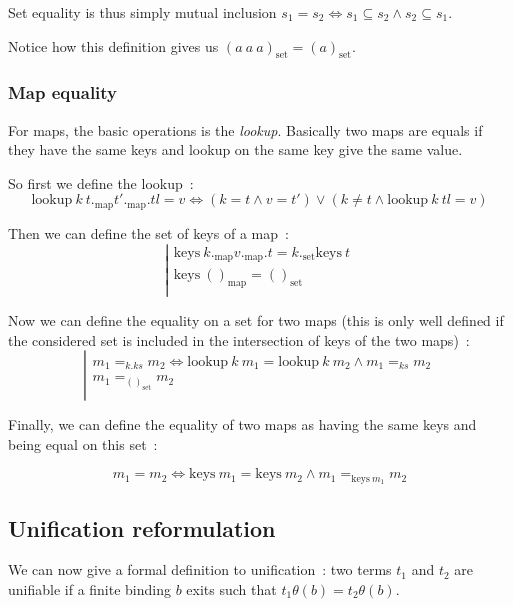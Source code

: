\documentclass[]{article}
\newcommand{\1}{\mathbbm{1}}
\newcommand{\0}{\mathbbm{0}}
\renewcommand{\subset}{\subseteq}
\begin{document}
Set equality is thus simply mutual inclusion
$s_1= s_2\iff s_1\subset s_2\wedge s_2\subset s_1$.

Notice how this definition gives us $(a\ a\ a)_\text{set} = (a)_\text{set}$.

\subsubsection{Map equality}

For maps, the basic operations is the \emph{lookup}. Basically two maps are
equals if they have the same keys and lookup on the same key give the same
value.

So first we define the lookup~:
\[\text{lookup}\ k\ t._\text{map} t'._\text{map}.tl = v \iff
(k = t\wedge v = t')\vee (k\neq t\wedge\text{lookup}\ k\ tl = v) \]

Then we can define the set of keys of a map~:
\[\left|\begin{array}{l}
    \text{keys}\ k._\text{map}v._\text{map}.t = k._\text{set}\text{keys}\ t \\
    \text{keys}\ ()_\text{map} = ()_\text{set} \\
\end{array}\right.\]

Now we can define the equality on a set for two maps (this is only well defined
if the considered set is included in the intersection of keys of the two maps)~:
\[\left|\begin{array}{l}
    m_1 =_{k.ks} m_2 \iff \text{lookup}\ k\ m_1 = \text{lookup}\ k\ m_2
                          \wedge m_1 =_{ks} m_2 \\
    m_1 =_{()_\text{set}} m_2 \\
\end{array}\right.\]

Finally, we can define the equality of two maps as having the same keys and
being equal on this set~:

\[m_1 = m_2 \iff \text{keys}\ m_1 = \text{keys}\ m_2
                 \wedge m_1 =_{\text{keys}\ m_1} m_2 \]

\subsection{Unification reformulation}

We can now give a formal definition to unification~: two terms $t_1$ and $t_2$ are
unifiable if a finite binding $b$ exits such that $t_1\theta(b) = t_2\theta(b)$.
\end{document}
